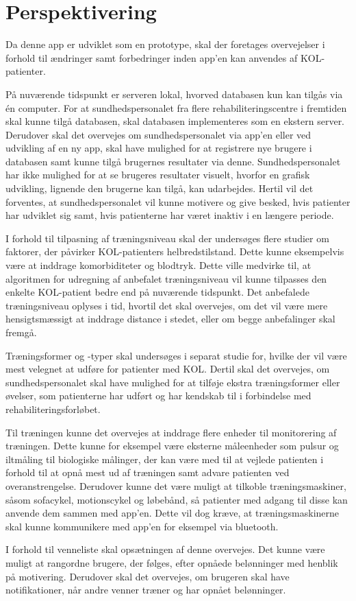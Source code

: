\section{Perspektivering}
Da denne app er udviklet som en prototype, skal der foretages overvejelser i forhold til ændringer samt forbedringer inden app'en kan anvendes af KOL-patienter. 

På nuværende tidspunkt er serveren lokal, hvorved databasen kun kan tilgås via én computer. For at sundhedspersonalet fra flere rehabiliteringscentre i fremtiden skal kunne tilgå databasen, skal databasen implementeres som en ekstern server. Derudover skal det overvejes om sundhedspersonalet via app’en eller ved udvikling af en ny app, skal have mulighed for at registrere nye brugere i databasen samt kunne tilgå brugernes resultater via denne. Sundhedspersonalet har ikke mulighed for at se brugeres resultater visuelt, hvorfor en grafisk udvikling, lignende den brugerne kan tilgå, kan udarbejdes. Hertil vil det forventes, at sundhedspersonalet vil kunne motivere og give besked, hvis patienter har udviklet sig samt, hvis patienterne har været inaktiv i en længere periode. 

I forhold til tilpasning af træningsniveau skal der undersøges flere studier om faktorer, der påvirker KOL-patienters helbredstilstand. Dette kunne eksempelvis være at inddrage komorbiditeter og blodtryk. Dette ville medvirke til, at algoritmen for udregning af anbefalet træningsniveau vil kunne tilpasses den enkelte KOL-patient bedre end på nuværende tidspunkt. Det anbefalede træningsniveau oplyses i tid, hvortil det skal overvejes, om det vil være mere hensigtsmæssigt at inddrage distance i stedet, eller om begge anbefalinger skal fremgå. 

Træningsformer og -typer skal undersøges i separat studie for, hvilke der vil være mest velegnet at udføre for patienter med KOL. Dertil skal det overvejes, om sundhedspersonalet skal have mulighed for at tilføje ekstra træningsformer eller øvelser, som patienterne har udført og har kendskab til i forbindelse med rehabiliteringsforløbet.

Til træningen kunne det overvejes at inddrage flere enheder til monitorering af træningen. Dette kunne for eksempel være eksterne måleenheder som pulsur og iltmåling til biologiske målinger, der kan være med til at vejlede patienten i forhold til at opnå mest ud af træningen samt advare patienten ved overanstrengelse. Derudover kunne det være muligt at tilkoble træningsmaskiner, såsom sofacykel, motionscykel og løbebånd, så patienter med adgang til disse kan anvende dem sammen med app’en. Dette vil dog kræve, at træningsmaskinerne skal kunne kommunikere med app’en for eksempel via bluetooth. 

I forhold til venneliste skal opsætningen af denne overvejes. Det kunne være muligt at rangordne brugere, der følges, efter opnåede belønninger med henblik på motivering. Derudover skal det overvejes, om brugeren skal have notifikationer, når andre venner træner og har opnået belønninger. 